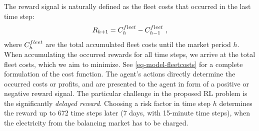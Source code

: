\documentclass[a4paper, 12pt]{article}
\begin{document}
The reward signal is naturally defined as the fleet costs that occurred in the
last time step:
\begin{equation}
    R_{h+1} = C^{fleet}_{h} - C^{fleet}_{h-1} \text{ ,}
\end{equation}
where \(C^{fleet}_{h}\) are the total accumulated fleet costs until the market period
\(h\). When accumulating the occurred rewards for all time steps, we arrive at the
total fleet costs, which we aim to minimize. See \eqref{eq-model-fleetcosts} for a
complete formulation of the cost function. The agent's actions directly
determine the occurred costs or profits, and are presented to the agent in form
of a positive or negative reward signal. The particular challenge in the
proposed RL problem is the significantly \emph{delayed reward}. Choosing a risk
factor in time step \(h\) determines the reward up to 672 time steps later (7
days, with 15-minute time steps), when the electricity from the balancing market
has to be charged.
\end{document}
